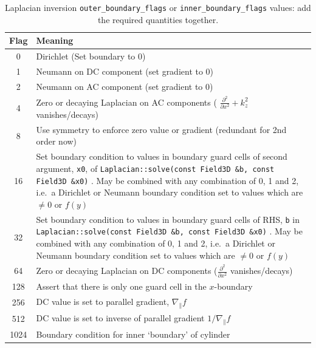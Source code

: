 \documentclass[12pt]{article}
\newcommand{\code}[1]{\texttt{#1}}
\begin{document}
%
\begin{table}
\caption{Laplacian inversion \code{outer\_boundary\_flags} or
\code{inner\_boundary\_flags} values: add the required quantities together.}
%
\label{tab:laplaceBCflags}
%
\centering
%
\begin{tabular}[c]{c|p{14cm}}
\hline
Flag & Meaning \\
 &  Dirichlet (Set boundary to 0) \\
1 &  Neumann on DC component (set gradient to 0) \\
2 &  Neumann on AC component (set gradient to 0) \\
4 &  Zero or decaying Laplacian on AC components ( $\frac{\partial^2}{\partial 
x^2}+k_z^2$ vanishes/decays)\\
8 & Use symmetry to enforce zero value or gradient (redundant for 2nd order 
now) \\
16 & Set boundary condition to values in boundary guard cells of second 
argument, \code{x0}, of
%
\lstinline!Laplacian::solve(const Field3D &b, const Field3D &x0)!
%
.  May be combined with any combination of 0, 1 and 2, i.e.\ a Dirichlet or 
Neumann boundary condition set to values which are $\neq 0$ or $f(y)$ \\
32 & Set boundary condition to values in boundary guard cells of RHS, \code{b} 
in
%
\lstinline!Laplacian::solve(const Field3D &b, const Field3D &x0)!
%
.  May be combined with any combination of 0, 1 and 2, i.e.\ a Dirichlet or 
Neumann boundary condition set to values which are $\neq 0$ or $f(y)$\\
64 & Zero or decaying Laplacian on DC components ($\frac{\partial^2}{\partial 
x^2}$ vanishes/decays) \\
128 &  Assert that there is only one guard cell in the
$x$-boundary \\
256 &  DC value is set to parallel gradient, $\nabla_\parallel f$ \\
512 &  DC value is set to inverse of parallel gradient $1/\nabla_\parallel f$ \\
1024 & Boundary condition for inner `boundary' of cylinder \\
\hline
\end{tabular}
%
\end{table}
%
\end{document}
